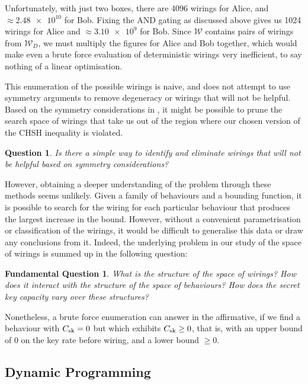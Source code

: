 \documentclass[10pt, a4paper]{article}
\numberwithin{equation}{section} %
\theoremstyle{definition}
\theoremstyle{plain}
\newtheorem{question}{Question}
\newtheorem{funqn}{Fundamental Question}
\newcommand{\?}{\mathrel{?}} %
\newcommand{\sW}{\mathcal{W}}
\newcommand{\sk}{\rm sk}
\begin{document}
      Unfortunately, with just two boxes, there are 4096 wirings for Alice, and \(\approx \num{2.48e10}\) for Bob. Fixing the AND gating as discussed above gives us 1024 wirings for Alice and \(\approx \num{3.10e9}\) for Bob. Since \(\sW\) contains pairs of wirings from \(\sW_D\), we must multiply the figures for Alice and Bob together, which would make even a brute force evaluation of deterministic wirings very inefficient, to say nothing of a linear optimisation.

      This enumeration of the possible wirings is naive, and does not attempt to use symmetry arguments to remove degeneracy or wirings that will not be helpful. Based on the symmetry considerations in , it might be possible to prune the search space of wirings that take us out of the region where our chosen version of the CHSH inequality is violated.

      \begin{question}
        Is there a simple way to identify and eliminate wirings that will not be helpful based on symmetry considerations?
      \end{question}

      However, obtaining a deeper understanding of the problem through these methods seems unlikely. Given a family of behaviours and a bounding function, it is possible to search for the wiring for each particular behaviour that produces the largest increase in the bound. However, without a convenient parametrisation or classification of the wirings, it would be difficult to generalise this data or draw any conclusions from it. Indeed, the underlying problem in our study of the space of wirings is summed up in the following question:
      \begin{funqn}\label{fqn:wir}
        What is the structure of the space of wirings? How does it interact with the structure of the space of behaviours? How does the secret key capacity vary over these structures?
      \end{funqn}

      Nonetheless, a brute force enumeration can answer  in the affirmative, if we find a behaviour with \(C_{\sk} = 0\) but which exhibits \(C_{\sk} \geq 0\), that is, with an upper bound of 0 on the key rate before wiring, and a lower bound \(\geq 0\).

      \subsection{Dynamic Programming}
\end{document}

